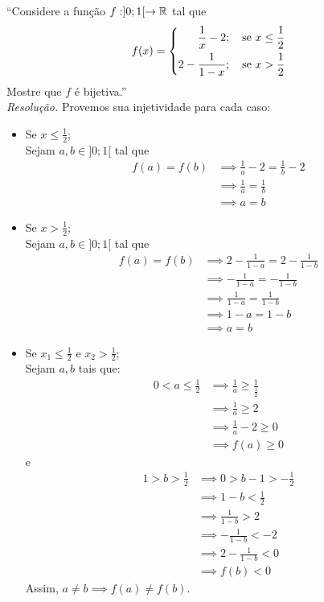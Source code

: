 \enquote{Considere a função $f: ]0; 1[ \rightarrow \mathbb R$ tal que
\begin{displaymath}
    f(x) = \left\{\begin{aligned}
        \frac{1}{x} - 2&; \quad \text{se $x \le \frac{1}{2}$} \\
        2 - \frac{1}{1 - x}&; \quad \text{se $x > \frac{1}{2}$}
    \end{aligned}\\ 
    \right.
\end{displaymath}
Mostre que $f$ é bijetiva.} \\

\emph{Resolução.} Provemos sua injetividade para cada caso:
\begin{itemize}
    \item Se $x \le \frac{1}{2}$; \\
    Sejam $a, b \in ]0; 1[$ tal que
    \begin{align*}
        f(a) = f(b) & \implies \frac{1}{a} - 2 = \frac{1}{b} -2 \\ & \implies
        \frac{1}{a} = \frac{1}{b} \\ & \implies
        a = b
    \end{align*}
    \item Se $x > \frac{1}{2}$; \\
    Sejam $a, b \in ]0; 1[$ tal que 
    \begin{align*}
        f(a) = f(b) & \implies 2 - \frac{1}{1 - a} = 2 - \frac{1}{1 - b} \\ & \implies
        - \frac{1}{1 - a} = - \frac{1}{1 - b} \\ & \implies
        \frac{1}{1 - a} = \frac{1}{1 - b} \\ & \implies
        1 - a = 1 - b \\ & \implies
        a = b
    \end{align*}
    \item Se $x_1 \le \frac{1}{2}$ e $x_2 > \frac{1}{2}$; \\
    Sejam $a, b$ tais que:
    \begin{align*}
        0 < a \le \frac{1}{2} & \implies \frac{1}{a} \ge \frac{1}{\frac{1}{2}} \\ & \implies
        \frac{1}{a} \ge 2 \\ & \implies
        \frac{1}{a} - 2 \ge 0 \\ & \implies
        f(a) \ge 0
    \end{align*}
    e
    \begin{align*}
        1 > b > \frac{1}{2} & \implies 0 > b - 1 > -\frac{1}{2} \\ & \implies
        1 - b < \frac{1}{2} \\ & \implies
        \frac{1}{1 - b} > 2 \\ & \implies
        -\frac{1}{1 - b} < -2 \\ & \implies
        2 - \frac{1}{1 - b} < 0 \\ & \implies
        f(b) < 0
    \end{align*}
    Assim, $a \ne b \implies f(a) \ne f(b)$.
\end{itemize}
